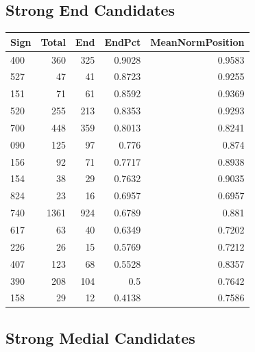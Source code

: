 ﻿\documentclass[11pt,a4paper]{article}
\begin{document}
\subsection*{Strong End Candidates}

\begin{center}
\begin{tabular}{lrrrr}
\toprule
\textbf{Sign} & \textbf{Total} & \textbf{End} & \textbf{EndPct} & \textbf{MeanNormPosition} \\
\midrule
400 & 360 & 325 & 0.9028 & 0.9583 \\
527 & 47 & 41 & 0.8723 & 0.9255 \\
151 & 71 & 61 & 0.8592 & 0.9369 \\
520 & 255 & 213 & 0.8353 & 0.9293 \\
700 & 448 & 359 & 0.8013 & 0.8241 \\
090 & 125 & 97 & 0.776 & 0.874 \\
156 & 92 & 71 & 0.7717 & 0.8938 \\
154 & 38 & 29 & 0.7632 & 0.9035 \\
824 & 23 & 16 & 0.6957 & 0.6957 \\
740 & 1361 & 924 & 0.6789 & 0.881 \\
617 & 63 & 40 & 0.6349 & 0.7202 \\
226 & 26 & 15 & 0.5769 & 0.7212 \\
407 & 123 & 68 & 0.5528 & 0.8357 \\
390 & 208 & 104 & 0.5 & 0.7642 \\
158 & 29 & 12 & 0.4138 & 0.7586 \\
\bottomrule
\end{tabular}
\end{center}

\subsection*{Strong Medial Candidates}
\end{document}
